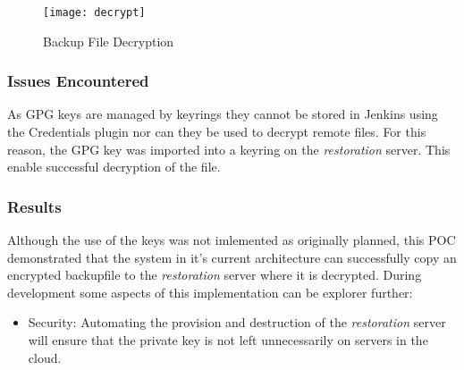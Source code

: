 	\begin{figure}[H]
		\caption{Backup File Decryption}
		\centering
		\texttt{[image: decrypt]}
		\label{fig:decrypt}
	\end{figure}
	
	\subsubsection{Issues Encountered}
	As GPG keys are managed by keyrings they cannot be stored in Jenkins using the Credentials plugin nor can they be used to decrypt remote files. For this reason, the GPG key was imported into a keyring on the \textit{restoration} server. This enable  successful decryption of the file.
	
	\subsubsection{Results}
	Although the use of the keys was not imlemented as originally planned, this POC demonstrated that the system in it's current architecture can successfully copy an encrypted backupfile to the \textit{restoration} server where it is decrypted. During development some aspects of this implementation can be explorer further:
	\begin{itemize}
		\item Security: Automating the provision and destruction of the \textit{restoration} server will ensure that the private key is not left unnecessarily on servers in the cloud. 
	\end{itemize}
	